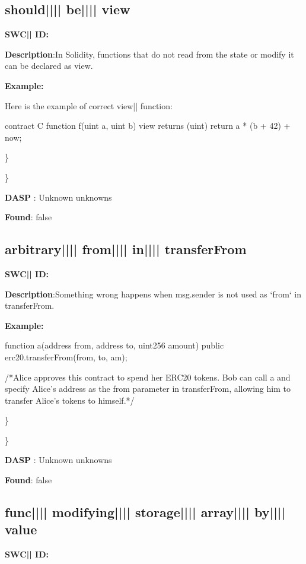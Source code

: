 \documentclass{article}
\begin{document}
\subsection{should{||\textunderscore|| }be{||\textunderscore|| }view} 
\textbf{SWC{|\textunderscore| }ID:} 

\textbf{Description}:In Solidity, functions that do not read from the state or modify it can be declared as view.


\textbf{Example:} 
\begin{ffcode} 

Here is the example of correct view|\textendash| function:

contract C {
    function f(uint a, uint b) view returns (uint) {
        return a * (b + 42) + now;
    }
}

\end{ffcode} 
\} 

\} 

\textbf{DASP} : Unknown unknowns

\textbf{Found}: false

\subsection{arbitrary{||\textunderscore|| }from{||\textunderscore|| }in{||\textunderscore|| }transferFrom} 
\textbf{SWC{|\textunderscore| }ID:} 

\textbf{Description}:Something wrong happens when msg.sender is not used as `from` in transferFrom.


\textbf{Example:} 
\begin{ffcode} 

function a(address from, address to, uint256 amount) public {
  erc20.transferFrom(from, to, am);
}

 /*Alice approves this contract to spend her ERC20 tokens. Bob can call a and specify Alice's address as the from parameter in transferFrom, allowing him to transfer Alice's tokens to himself.*/ 

\end{ffcode} 
\} 

\} 

\textbf{DASP} : Unknown unknowns

\textbf{Found}: false

\subsection{func{||\textunderscore|| }modifying{||\textunderscore|| }storage{||\textunderscore|| }array{||\textunderscore|| }by{||\textunderscore|| }value} 
\textbf{SWC{|\textunderscore| }ID:} 
\end{document}
